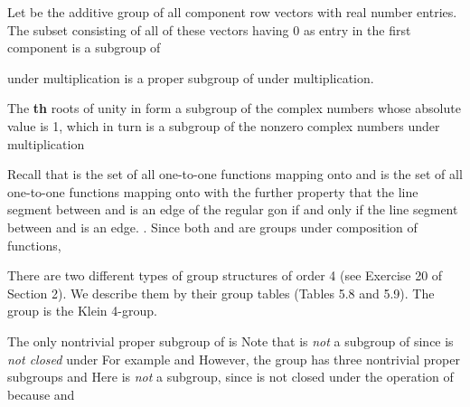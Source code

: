 \documentclass[11pt,oneside]{article}
\begin{document}
\begin{BookBody}

 Let  be the additive group of all component row vectors with real number entries. The subset consisting of all of these vectors having 0 as entry in the first component is a subgroup of \BookEnd{\blacktriangle}

  under multiplication is a proper subgroup of  under multiplication. \BookEnd{\blacktriangle}

 The \textbf{th} roots of unity in  form a subgroup of  the complex numbers whose absolute value is 1, which in turn is a subgroup of  the nonzero complex numbers under multiplication\BookEnd{\blacktriangle}

 Recall that  is the set of all one-to-one functions mapping  onto  and  is the set of all one-to-one functions \BookInline{\phi } mapping  onto  with the further property that the line segment between  and  is an edge of the regular gon  if and only if the line segment between  and  is an edge. . Since both  and  are groups under composition of functions,  \BookEnd{\blacktriangle}

 There are two different types of group structures of order 4 (see Exercise 20 of Section 2). We describe them by their group tables (Tables 5.8 and 5.9). The group  is the Klein 4-group.

The only nontrivial proper subgroup of  is  Note that  is\textit{ not} a subgroup of  since  is\textit{ not closed} under  For example and  However, the group  has three nontrivial proper subgroups and  Here  is\textit{ not} a subgroup, since  is not closed under the operation of  because  and \BookEnd{\blacktriangle}


\end{BookBody}
\end{document}
